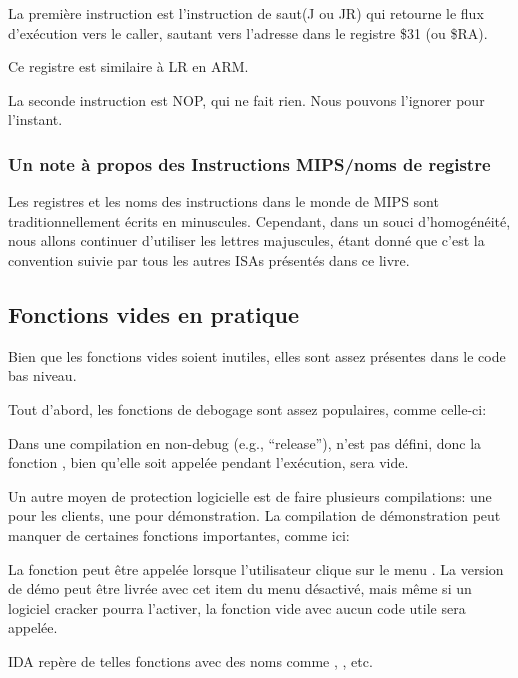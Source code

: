 

La première instruction est l'instruction de saut(J ou JR) qui retourne le flux d'exécution vers le \gls{caller},
sautant vers l'adresse dans le registre \$31 (ou \$RA).

Ce registre est similaire à \ac{LR} en ARM.

La seconde instruction est \ac{NOP}, qui ne fait rien.
Nous pouvons l'ignorer pour l'instant.

\subsubsection{Un note à propos des Instructions MIPS/noms de registre}

Les registres et les noms des instructions dans le monde de MIPS sont traditionnellement écrits en minuscules.
Cependant, dans un souci d'homogénéité, nous allons continuer d'utiliser les lettres majuscules,
étant donné que c'est la convention suivie par tous les autres \ac{ISA}s présentés dans ce livre.

\subsection{Fonctions vides en pratique}

Bien que les fonctions vides soient inutiles, elles sont assez présentes dans le code bas niveau.

Tout d'abord, les fonctions de debogage sont assez populaires, comme celle-ci:



Dans une compilation en non-debug (e.g., ``release''),  n'est pas défini,
donc la fonction , bien qu'elle soit appelée pendant l'exécution,
sera vide.

Un autre moyen de protection logicielle est de faire plusieurs compilations: une pour les clients, une pour démonstration.
La compilation de démonstration peut manquer de certaines fonctions importantes, comme ici:



La fonction  peut être appelée lorsque l'utilisateur clique sur le menu .
La version de démo peut être livrée avec cet item du menu désactivé, mais même si un logiciel cracker pourra l'activer,
la fonction vide avec aucun code utile sera appelée.

IDA repère de telles fonctions avec des noms comme , , etc.

